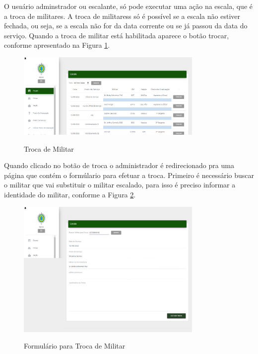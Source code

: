 O usuário adminstrador ou escalante, só pode executar uma ação na escala, que é a troca de militares. A troca de militaress só é possível se a escala não estiver fechada, ou seja, se a escala não for da data corrente ou se já passou da data do serviço. Quando a troca de militar está habilitada aparece o botão trocar, conforme apresentado na  Figura \ref{fig:replace}.

\begin{figure}[!htb]
    \centering
    \caption{Troca de Militar}
    \includegraphics[width=0.8\textwidth]{images/7 - Troca de Militar.png}
    \label{fig:replace}
\end{figure}

Quando clicado no botão de troca o administrador é redirecionado pra uma página que contém o formúlario para efetuar a troca. Primeiro é  necessário buscar o militar que vai substituir o militar escalado, para isso é preciso informar a identidade do militar, conforme a Figura \ref{fig:formreplace}.

\begin{figure}[!htb]
    \centering
    \caption{Formulário para Troca de Militar}
    \includegraphics[width=0.8\textwidth]{images/7 - Troca de Militar - 2.png}
    \label{fig:formreplace}
\end{figure}

